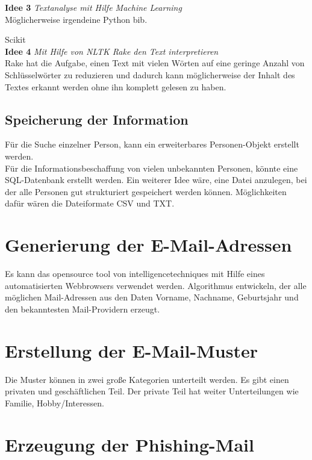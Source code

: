	{\bf Idee 3} \textit{Textanalyse mit Hilfe Machine Learning}\\
	Möglicherweise irgendeine Python bib.
	
	Scikit\\
	
	{\bf Idee 4} \textit{Mit Hilfe von NLTK Rake den Text interpretieren}\\
	Rake hat die Aufgabe, einen Text mit vielen Wörten auf eine geringe Anzahl von Schlüsselwörter zu reduzieren und dadurch kann möglicherweise der Inhalt des Textes erkannt werden ohne ihn komplett gelesen zu haben.
	
	\subsection{Speicherung der Information}
	Für die Suche einzelner Person, kann ein erweiterbares Personen-Objekt erstellt werden.\\
	Für die Informationsbeschaffung von vielen unbekannten Personen, könnte eine SQL-Datenbank erstellt werden. Ein weiterer Idee wäre, eine Datei anzulegen, bei der alle Personen gut strukturiert gespeichert werden können. Möglichkeiten dafür wären die Dateiformate CSV und TXT.%

\section{Generierung der E-Mail-Adressen}
Es kann das opensource tool von intelligencetechniques mit Hilfe eines automatisierten Webbrowsers verwendet werden. Algorithmus entwickeln, der alle möglichen Mail-Adressen aus den Daten Vorname, Nachname, Geburtsjahr und den bekanntesten Mail-Providern erzeugt.

\section{Erstellung der E-Mail-Muster}
Die Muster können in zwei große Kategorien unterteilt werden. Es gibt einen privaten und geschäftlichen Teil. Der private Teil hat weiter Unterteilungen wie Familie, Hobby/Interessen.
\section{Erzeugung der Phishing-Mail}
